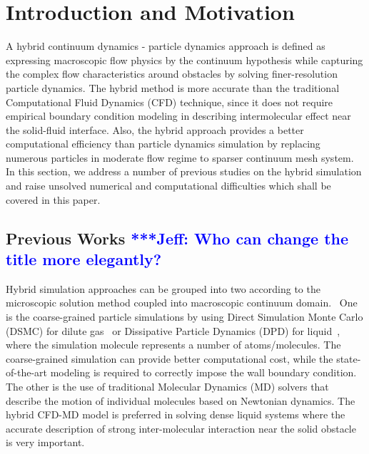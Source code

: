 \documentclass[preprint,12pt]{elsarticle}
\newcommand{\skonote}[1]{ {\textcolor{blue} { ***Jeff: #1 }}}
\newcommand{\skonote}[1]{}
\begin{document}




\section{Introduction and Motivation}

A hybrid continuum dynamics - particle dynamics approach is defined as expressing macroscopic flow physics by the continuum hypothesis while capturing the complex flow characteristics around obstacles by solving finer-resolution particle dynamics. The hybrid method is more accurate than the traditional Computational Fluid Dynamics (CFD) technique, since it does not require empirical boundary condition modeling in describing intermolecular effect near the solid-fluid interface. Also, the hybrid approach provides a better computational efficiency than particle dynamics simulation
by replacing numerous particles in moderate flow regime to sparser continuum mesh system. 
In this section, we address a number of previous studies on the hybrid simulation and raise unsolved numerical and computational difficulties which shall be covered in this paper.


\subsection{Previous Works \skonote{Who can change the title more elegantly?}}
Hybrid simulation approaches can be grouped into two according to the microscopic solution method coupled into macroscopic continuum domain.~\cite{Koumoutsakos} One is the coarse-grained particle simulations by using Direct Simulation Monte Carlo (DSMC) for dilute gas~\cite{Garcia,Sun} or Dissipative Particle Dynamics (DPD) for liquid~\cite{Fedosov1,Fedosov2}, where the simulation molecule represents a number of atoms/molecules. The coarse-grained simulation can provide better computational cost, while the state-of-the-art modeling is required to correctly impose the wall boundary condition. The other is the use of traditional Molecular Dynamics (MD) solvers that describe the motion of individual molecules based on Newtonian dynamics. The hybrid CFD-MD model is preferred in solving dense liquid systems where the accurate description of strong inter-molecular interaction near the solid obstacle is very important.
\end{document}
